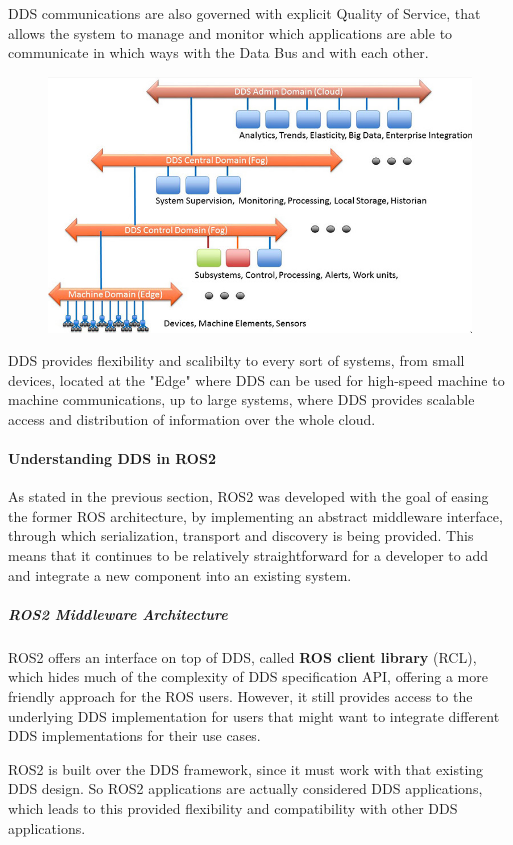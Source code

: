 DDS communications are also governed with explicit Quality of Service, that allows the system to manage and monitor which applications are able to communicate in which ways with the Data Bus and with each other. 

\begin{figure}[H]
    \centering
     \includegraphics[width=0.5\linewidth]{images/dds-scalable-architecture.png}
\end{figure}

DDS provides flexibility and scalibilty to every sort of systems, from small devices, located at the "Edge" where DDS can be used for high-speed machine to machine communications, up to large systems, where DDS provides scalable access and distribution of information over the whole cloud.


\paragraph{Understanding DDS in ROS2}

As stated in the previous section, ROS2 was developed with the goal of easing the former ROS architecture, by implementing an abstract middleware interface, through which serialization, transport and discovery is being provided. This means that it continues to be relatively straightforward for a developer to add and integrate a new component into an existing system.

\subparagraph{ROS2 Middleware Architecture}

ROS2 offers an interface on top of DDS, called \textbf{ROS client library} (RCL), which hides much of the complexity of DDS specification API, offering a more friendly approach for the ROS users. However, it still provides access to the underlying DDS implementation for users that might want to integrate different DDS implementations for their use cases.

ROS2 is built over the DDS framework, since it must work with that existing DDS design. So ROS2 applications are actually considered DDS applications, which leads to this provided flexibility and compatibility with other DDS applications.
                
